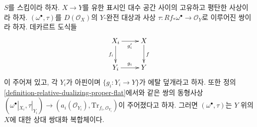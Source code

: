 \begin{lemma}
\label{lemma-covering-enough}
$S$를 스킴이라 하자. $X \to Y$를 유한 표시인 대수 공간 사이의
고유하고 평탄한 사상이라 하자. $(\omega^\bullet, \tau)$를
$D(\mathcal{O}_X)$의 $Y$-완전 대상과 사상
$\tau : Rf_*\omega^\bullet \to \mathcal{O}_Y$로 이루어진 쌍이라 하자.
데카르트 도식들
$$
\xymatrix{
X_i \ar[r]_{g_i'} \ar[d]_{f_i} & X \ar[d]^f \\
Y_i \ar[r]^{g_i} & Y
}
$$
이 주어져 있고, 각 $Y_i$가 아핀이며
$\{g_i : Y_i \to Y\}$가 에탈 덮개라고 하자. 또한 정의
\ref{definition-relative-dualizing-proper-flat}에서와 같은 쌍의
동형사상
$(\omega^\bullet|_{X_i}, \tau|_{Y_i})
\to (a_i(\mathcal{O}_{Y_i}), \text{Tr}_{f_i, \mathcal{O}_{Y_i}})$이
주어졌다고 하자. 그러면 $(\omega^\bullet, \tau)$는 $Y$ 위의 $X$에
대한 상대 쌍대화 복합체이다.
\end{lemma}

